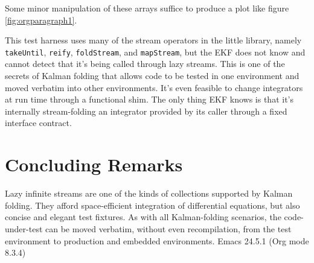 \documentclass[10pt,oneside,x11names]{article}
\begin{document}
Some minor manipulation of these arrays suffice to produce a plot like figure 
\ref{fig:orgparagraph1}.

This test harness uses many of the stream operators in the little library,
namely \texttt{takeUntil}, \texttt{reify}, \texttt{foldStream}, and \texttt{mapStream}, but the EKF does not
know and cannot detect that it's being called through lazy streams. This is one
of the secrets of Kalman folding that allows code to be tested in one
environment and moved verbatim into other environments. It's even feasible to
change integrators at run time through a functional shim. The only thing EKF
knows is that it's internally stream-folding an integrator provided by its caller
through a fixed interface contract.

\section{Concluding Remarks}
\label{sec:orgheadline15}

Lazy infinite streams are one of the kinds of collections supported by Kalman
folding. They afford space-efficient integration of differential equations, but
also concise and elegant test fixtures. As with all Kalman-folding scenarios,
the code-under-test can be moved verbatim, without even recompilation, from the
test environment to production and embedded environments.
Emacs 24.5.1 (Org mode 8.3.4)
\end{document}
